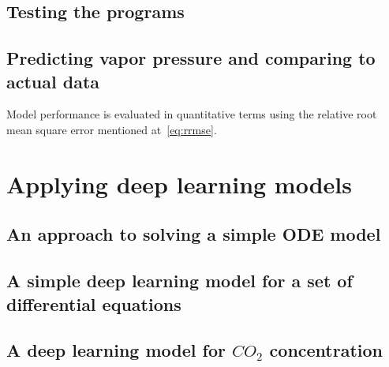 \documentclass[a4paper]{article}
\begin{document}
\subsection{Testing the programs}

\subsection{Predicting vapor pressure and comparing to actual data}
Model performance is evaluated in quantitative terms using the relative root mean square error mentioned at~\eqref{eq:rrmse}.

\newpage
\section{Applying deep learning models}
\subsection{An approach to solving a simple ODE model}

\subsection{A simple deep learning model for a set of differential equations}

\subsection{A deep learning model for \texorpdfstring{\(CO_2\)}{} concentration}

\newpage

\printbibliography[heading=bibintoc]
\end{document}
